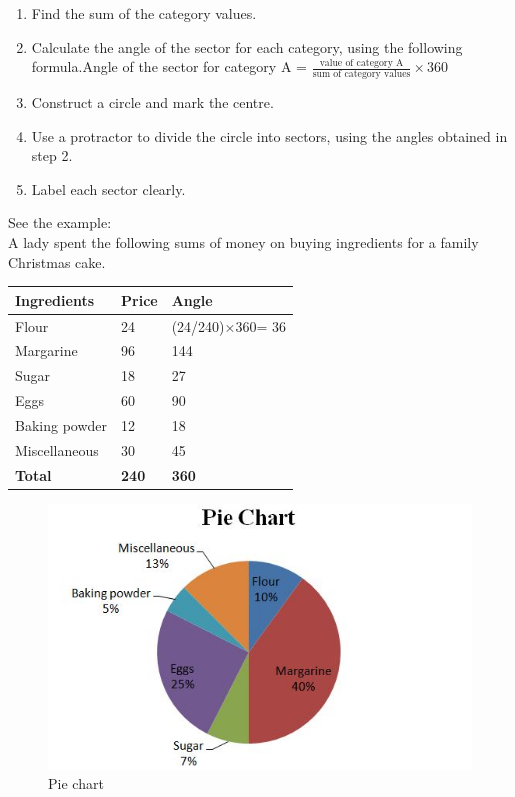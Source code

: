 \documentclass[
]{book}
\providecommand{\tightlist}{%
  \setlength{\itemsep}{0pt}\setlength{\parskip}{0pt}}
\begin{document}
\begin{enumerate}
\def\labelenumi{\arabic{enumi}.}
\tightlist
\item
  Find the sum of the category values.\\
\item
  Calculate the angle of the sector for each category, using the following formula.Angle of the sector for category A = \(\frac{\text{value of category A}}{\text{sum of category values}} \times 360\)\\
\item
  Construct a circle and mark the centre.\\
\item
  Use a protractor to divide the circle into sectors, using the angles obtained in step 2.\\
\item
  Label each sector clearly.
\end{enumerate}

See the example:\\
A lady spent the following sums of money on buying ingredients for a family Christmas cake.

\begin{longtable}[]{@{}lll@{}}
\toprule
Ingredients & Price & Angle \\
\midrule
\endhead
Flour & 24 & (24/240)×360= 36 \\
Margarine & 96 & 144 \\
Sugar & 18 & 27 \\
Eggs & 60 & 90 \\
Baking powder & 12 & 18 \\
Miscellaneous & 30 & 45 \\
\textbf{Total} & \textbf{240} & \textbf{360} \\
\bottomrule
\end{longtable}

\begin{figure}

{\centering \includegraphics[width=0.5\linewidth]{images/image17} 

}

\caption{Pie chart}\label{fig:oiechart}
\end{figure}
\end{document}
